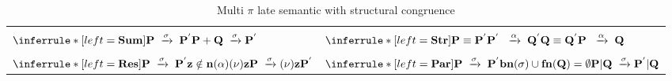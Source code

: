 \begin{definition}
\begin{table}
\begin{tabular}{ll}
      \\\\
	  $\inferrule* [left=\bf{Sum}]{
	    P\; \xrightarrow{\sigma}\; P^{'}
	  }{
	    P+Q \;\xrightarrow{\sigma} P^{'}
	  }$
	&
	  $\inferrule* [left=\bf{Str}]{
	      P\equiv P^{'}
	    \\
	      P^{'}\; \;\xrightarrow{\alpha}\; Q^{'}
	    \\
	      Q\equiv Q^{'}
	  }{
	      P\; \;\xrightarrow{\alpha}\; Q
	  }$
      \\\\
	  $\inferrule* [left=\bf{Res}]{
	      P\; \xrightarrow{\sigma}\; P^{'}
	    \\
	      z\notin n(\alpha)
	  }{
	    (\nu) z P \;\xrightarrow{\sigma} (\nu) z P^{'}
	  }$
	&
	  $\inferrule* [left=\bf{Par}]{
	      P\; \xrightarrow{\sigma}\; P^{'}
	    \\
	      bn(\sigma)\cup fn(Q)=\emptyset
	  }{
	    P|Q \;\xrightarrow{\sigma} P^{'}|Q
	  }$
      \\\hline
    \end{tabular}
    \caption{Multi $\pi$ late semantic with structural congruence}
    \label{multipisoloinputlateywith}
  \end{table}
\end{definition}

